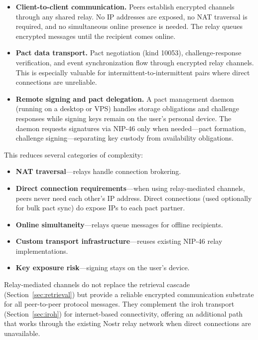 \documentclass[11pt,a4paper]{article}
\begin{document}
\begin{itemize}
  \item \textbf{Client-to-client communication.} Peers establish encrypted channels through any shared relay. No IP addresses are exposed, no NAT traversal is required, and no simultaneous online presence is needed. The relay queues encrypted messages until the recipient comes online.

  \item \textbf{Pact data transport.} Pact negotiation (kind 10053), challenge-response verification, and event synchronization flow through encrypted relay channels. This is especially valuable for intermittent-to-intermittent pairs where direct connections are unreliable.

  \item \textbf{Remote signing and pact delegation.} A pact management daemon (running on a desktop or VPS) handles storage obligations and challenge responses while signing keys remain on the user's personal device. The daemon requests signatures via NIP-46 only when needed---pact formation, challenge signing---separating key custody from availability obligations.
\end{itemize}

This reduces several categories of complexity:

\begin{itemize}
  \item \textbf{NAT traversal}---relays handle connection brokering.
  \item \textbf{Direct connection requirements}---when using relay-mediated channels, peers never need each other's IP address. Direct connections (used optionally for bulk pact sync) do expose IPs to each pact partner.
  \item \textbf{Online simultaneity}---relays queue messages for offline recipients.
  \item \textbf{Custom transport infrastructure}---reuses existing NIP-46 relay implementations.
  \item \textbf{Key exposure risk}---signing stays on the user's device.
\end{itemize}

Relay-mediated channels do not replace the retrieval cascade (Section~\ref{sec:retrieval}) but provide a reliable encrypted communication substrate for all peer-to-peer protocol messages. They complement the iroh transport (Section~\ref{sec:iroh}) for internet-based connectivity, offering an additional path that works through the existing Nostr relay network when direct connections are unavailable.
\end{document}
